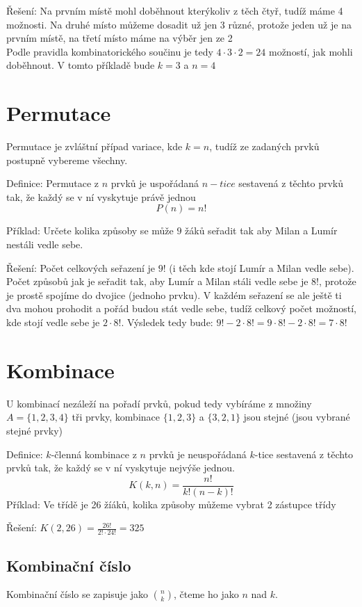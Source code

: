 \documentclass[12pt]{article}
\begin{document}
Řešení: Na prvním místě mohl doběhnout kterýkoliv z těch čtyř, tudíž máme 4 možnosti.
 Na druhé místo můžeme dosadit už jen 3 různé, protože jeden už je na prvním místě, na třetí místo máme na výběr jen ze 2\\
Podle pravidla kombinatorického součinu je tedy $4 \cdot 3 \cdot 2 = 24$ možností, jak mohli doběhnout. V tomto příkladě bude $k = 3$ a $n = 4$

\section*{Permutace}
Permutace je zvláštní případ variace, kde $k=n$, tudíž ze zadaných prvků postupně vybereme všechny.

Definice: Permutace z $n$ prvků je uspořádaná $n-tice$ sestavená z těchto prvků tak, že každý se v ní vyskytuje právě jednou\\
\[P(n) = n!\]

Příklad: Určete kolika způsoby se může $9$ žáků seřadit tak aby Milan a Lumír nestáli
 vedle sebe.

Řešení: Počet celkových seřazení je $9!$ (i těch kde stojí Lumír a Milan vedle sebe). 
Počet způsobů jak je seřadit tak, aby Lumír a Milan stáli vedle sebe je $8!$, protože 
je prostě spojíme do dvojice (jednoho prvku). V každém seřazení se ale ještě ti dva 
mohou prohodit a pořád budou stát vedle sebe, tudíž celkový počet možností, kde stojí 
vedle sebe je $2\cdot 8!$. Výsledek tedy bude: $9! - 2\cdot8! = 9 \cdot 8! - 2\cdot 8! = 7\cdot 8!$

\section*{Kombinace}
U kombinací nezáleží na pořadí prvků, pokud tedy vybíráme z množiny $A = \{1,2,3,4\}$ tři prvky, kombinace $\{1,2,3\}$ a $\{3,2,1\}$ jsou stejné (jsou vybrané stejné prvky)

Definice: $k$-členná kombinace z $n$ prvků je neuspořádaná $k$-tice sestavená z těchto prvků tak, že každý se v ní vyskytuje nejvýše jednou.
\[K(k,n) = \frac{n!}{k!(n-k)!}\]
Příklad: Ve třídě je 26 žíáků, kolika způsoby můžeme vybrat 2 zástupce třídy

Řešení: $K(2,26) = \frac{26!}{2!\cdot24!} = 325$

\subsection*{Kombinační číslo}
Kombinační číslo se zapisuje jako $\binom{n}{k}$, čteme ho jako $n$ nad $k$.
\end{document}

